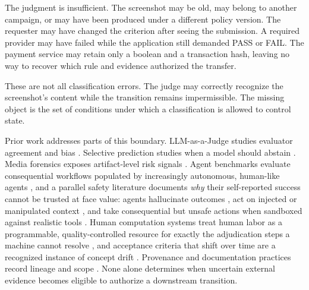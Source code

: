 \documentclass[sigconf,anonymous,review]{acmart}
\begin{document}
The judgment is insufficient. The screenshot may be old, may belong to another campaign, or may have been produced under a different policy version. The requester may have changed the criterion after seeing the submission. A required provider may have failed while the application still demanded PASS or FAIL. The payment service may retain only a boolean and a transaction hash, leaving no way to recover which rule and evidence authorized the transfer.

These are not all classification errors. The judge may correctly recognize the screenshot's content while the transition remains impermissible. The missing object is the set of conditions under which a classification is allowed to control state.

Prior work addresses parts of this boundary. LLM-as-a-Judge studies evaluator agreement and bias \cite{zheng2023judging,liu2023geval,wang2024fair}. Selective prediction studies when a model should abstain \cite{geifman2017selective,geifman2019selectivenet,kamath2020selectiveqa,hendrickx2024reject}. Media forensics exposes artifact-level risk signals \cite{verdoliva2020media}. Agent benchmarks evaluate consequential workflows populated by increasingly autonomous, human-like agents \cite{liu2023agentbench,zhou2023webarena,xie2024osworld,xu2024theagentcompany,yang2024sweagent,park2023generative}, and a parallel safety literature documents \emph{why} their self-reported success cannot be trusted at face value: agents hallucinate outcomes \cite{ji2023hallucination}, act on injected or manipulated context \cite{greshake2023injection}, and take consequential but unsafe actions when sandboxed against realistic tools \cite{ruan2024toolemu,kang2024exploiting}. Human computation systems treat human labor as a programmable, quality-controlled resource for exactly the adjudication steps a machine cannot resolve \cite{kittur2011crowdforge,little2010turkit,retelny2014flashteams,franklin2011crowddb}, and acceptance criteria that shift over time are a recognized instance of concept drift \cite{gama2014survey}. Provenance and documentation practices record lineage and scope \cite{bender2018data,gebru2021datasheets,mitchell2019modelcards}. None alone determines when uncertain external evidence becomes eligible to authorize a downstream transition.
\end{document}
